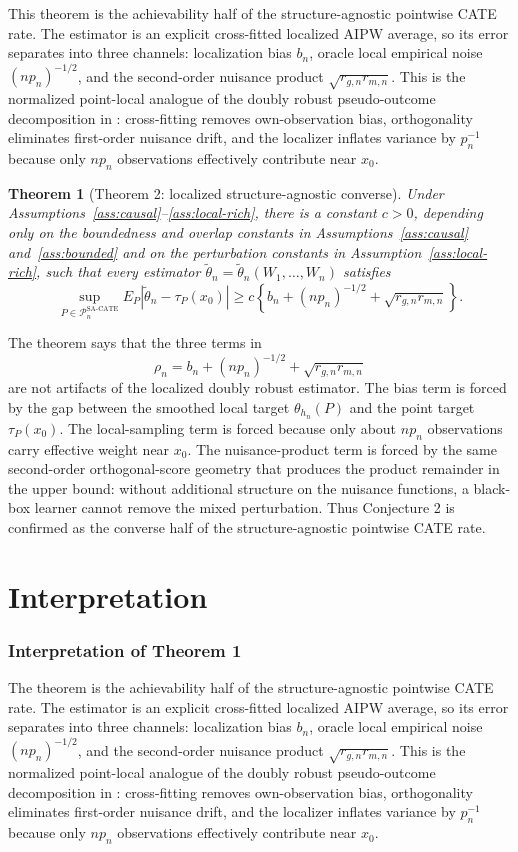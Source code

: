 \documentclass[11pt]{article}
\theoremstyle{definition}
\theoremstyle{plain}
\newtheorem{theorem}{Theorem}
\theoremstyle{remark}
\begin{document}
This theorem is the achievability half of the structure-agnostic pointwise CATE rate. The estimator is an explicit cross-fitted localized AIPW average, so its error separates into three channels: localization bias $b_n$, oracle local empirical noise $(n p_n)^{-1/2}$, and the second-order nuisance product $\sqrt{r_{g,n}r_{m,n}}$. This is the normalized point-local analogue of the doubly robust pseudo-outcome decomposition in \citet{Kennedy2023DRCATE}: cross-fitting removes own-observation bias, orthogonality eliminates first-order nuisance drift, and the localizer inflates variance by $p_n^{-1}$ because only $n p_n$ observations effectively contribute near $x_0$.

\begin{theorem}[Theorem 2: localized structure-agnostic converse]\label{thm:lower}
Under Assumptions~\ref{ass:causal}--\ref{ass:local-rich}, there is a constant $c>0$, depending only on the boundedness and overlap constants in Assumptions~\ref{ass:causal} and~\ref{ass:bounded} and on the perturbation constants in Assumption~\ref{ass:local-rich}, such that every estimator $\tilde\theta_n=\tilde\theta_n(W_1,\ldots,W_n)$ satisfies \[ \sup_{P\in\mathcal{P}_n^{\mathrm{SA\text{-}CATE}}} E_P\!\left|\tilde\theta_n-\tau_P(x_0)\right| \ge c\left\{b_n+(n p_n)^{-1/2}+\sqrt{r_{g,n}r_{m,n}}\right\}. \]
\end{theorem}

The theorem says that the three terms in
\[
  \rho_n=b_n+(n p_n)^{-1/2}+\sqrt{r_{g,n}r_{m,n}}
\]
are not artifacts of the localized doubly robust estimator. The bias term is forced by the gap between the smoothed local target $\theta_{h_n}(P)$ and the point target $\tau_P(x_0)$. The local-sampling term is forced because only about $n p_n$ observations carry effective weight near $x_0$. The nuisance-product term is forced by the same second-order orthogonal-score geometry that produces the product remainder in the upper bound: without additional structure on the nuisance functions, a black-box learner cannot remove the mixed perturbation. Thus Conjecture 2 is confirmed as the converse half of the structure-agnostic pointwise CATE rate.

\section{Interpretation}
\subsubsection*{Interpretation of Theorem 1}
The theorem is the achievability half of the structure-agnostic pointwise CATE rate. The estimator is an explicit cross-fitted localized AIPW average, so its error separates into three channels: localization bias $b_n$, oracle local empirical noise $(n p_n)^{-1/2}$, and the second-order nuisance product $\sqrt{r_{g,n}r_{m,n}}$. This is the normalized point-local analogue of the doubly robust pseudo-outcome decomposition in \citet{Kennedy2023DRCATE}: cross-fitting removes own-observation bias, orthogonality eliminates first-order nuisance drift, and the localizer inflates variance by $p_n^{-1}$ because only $n p_n$ observations effectively contribute near $x_0$.
\end{document}
